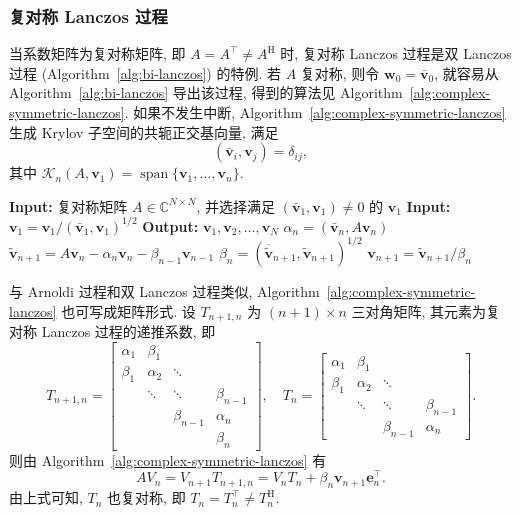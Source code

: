 \subsubsection{{复对称 Lanczos 过程}}\label{subsec:complex-symmetric-lanczos}
{当系数矩阵为复对称矩阵, 即 $A=A^\top\ne A^{\mathrm H}$ 时, 复对称 Lanczos 过程是双 Lanczos 过程 (Algorithm~\ref{alg:bi-lanczos}) 的特例. 若 $A$ 复对称, 则令 $\bm w_0=\bar{\bm v}_0$, 就容易从 Algorithm~\ref{alg:bi-lanczos} 导出该过程, 得到的算法见 Algorithm~\ref{alg:complex-symmetric-lanczos}.}
{如果不发生中断, Algorithm~\ref{alg:complex-symmetric-lanczos} 生成 Krylov 子空间的共轭正交基向量, 满足}
\[(\bar{\bm v}_i,\bm v_j)=\delta_{ij},\]
{其中 $\mathcal K_n(A,\bm v_1)=\operatorname{span}\{\bm v_1,\ldots,\bm v_n\}$.}
\begin{algorithm}[H]\caption{{复对称 Lanczos 过程 (注意: $(\bar{\bm a},\bm b)=\bm a^\top\bm b$)}}\label{alg:complex-symmetric-lanczos}\label{srcpage:printed-28}
\begin{algorithmic}[1]
\Statex\textbf{Input:} {复对称矩阵 $A\in\mathbb C^{N\times N}$, 并选择满足 $(\bar{\bm v}_1,\bm v_1)\ne0$ 的 $\bm v_1$}
\Statex\textbf{Input:} $\bm v_1=\bm v_1/(\bar{\bm v}_1,\bm v_1)^{1/2}$
\Statex\textbf{Output:} $\bm v_1,\bm v_2,\ldots,\bm v_N$
\State $\alpha_n=(\bar{\bm v}_n,A\bm v_n)$
\State $\tilde{\bm v}_{n+1}=A\bm v_n-\alpha_n\bm v_n-\beta_{n-1}\bm v_{n-1}$
\State $\beta_n=(\overline{\tilde{\bm v}}_{n+1},\tilde{\bm v}_{n+1})^{1/2}$
\State $\bm v_{n+1}=\tilde{\bm v}_{n+1}/\beta_n$
\EndFor
\end{algorithmic}\end{algorithm}
{与 Arnoldi 过程和双 Lanczos 过程类似, Algorithm~\ref{alg:complex-symmetric-lanczos} 也可写成矩阵形式. 设 $T_{n+1,n}$ 为 $(n+1)\times n$ 三对角矩阵, 其元素为复对称 Lanczos 过程的递推系数, 即}
\[
T_{n+1,n}=\begin{bmatrix}\alpha_1&\beta_1&&\\\beta_1&\alpha_2&\ddots&\\&\ddots&\ddots&\beta_{n-1}\\&&\beta_{n-1}&\alpha_n\\&&&\beta_n\end{bmatrix},\quad
T_n=\begin{bmatrix}\alpha_1&\beta_1&&\\\beta_1&\alpha_2&\ddots&\\&\ddots&\ddots&\beta_{n-1}\\&&\beta_{n-1}&\alpha_n\end{bmatrix}.
\]
{则由 Algorithm~\ref{alg:complex-symmetric-lanczos} 有}
\begin{equation}\label{eq:complex-lanczos-matrix-relation}
AV_n=V_{n+1}T_{n+1,n}=V_nT_n+\beta_n\bm v_{n+1}\bm e_n^\top.
\end{equation}
{由上式可知, $T_n$ 也复对称, 即 $T_n=T_n^\top\ne T_n^{\mathrm H}$.}
